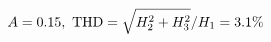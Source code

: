 \documentclass[preview]{standalone}
\begin{document}
\begin{align*}
\special{dvisvgm:raw <g id='unique000'>}A=0.15,\ \text{THD}=\sqrt{H_2^2+H_3^2}/H_1=3.1\%\special{dvisvgm:raw </g>}
\end{align*}
\end{document}
